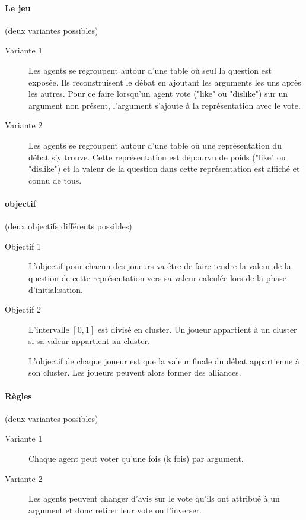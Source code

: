 \documentclass[12pt]{article}
\theoremstyle{defi}
\theoremstyle{not}
\theoremstyle{prob}
\begin{document}
  \paragraph{Le jeu}(deux variantes possibles)
    \begin{description}
      \item[Variante 1] Les agents se regroupent autour d'une table où seul la question est exposée. Ils reconstruisent le débat en ajoutant les arguments les uns après les autres. Pour ce faire lorsqu'un agent vote ("like" ou "dislike") sur un argument non présent, l'argument s'ajoute à la représentation avec le vote.

      \item[Variante 2] Les agents se regroupent autour d'une table où une représentation du débat s'y trouve. Cette représentation est dépourvu de poids ("like" ou "dislike") et la valeur de la question dans cette représentation est affiché et connu de tous.
    \end{description}

  \paragraph{objectif}(deux objectifs différents possibles)
  \begin{description}
    \item[Objectif 1] L'objectif pour chacun des joueurs va être de faire tendre la valeur de la question de cette représentation vers sa valeur calculée lors de la phase d'initialisation.
    \item[Objectif 2] L'intervalle $[0, 1]$ est divisé en cluster. Un joueur appartient à un cluster si sa valeur appartient au cluster.

    L'objectif de chaque joueur est que la valeur finale du débat appartienne à son cluster. Les joueurs peuvent alors former des alliances.
  \end{description}


  \paragraph{Règles}(deux variantes possibles)
    \begin{description}
      \item[Variante 1] Chaque agent peut voter qu'une fois (k fois) par argument.

      \item[Variante 2] Les agents peuvent changer d'avis sur le vote qu'ils ont attribué à un argument et donc retirer leur vote ou l'inverser.
    \end{description}
\end{document}
